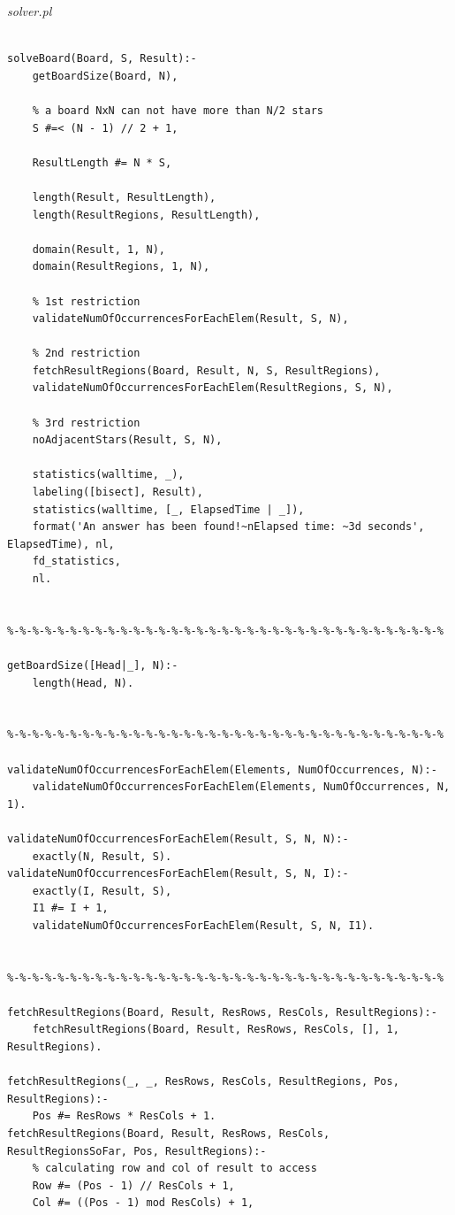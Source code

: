 \documentclass[runningheads,a4paper]{llncs}
\begin{document}
\noindent
{\it solver.pl}
\begin{changemargin}{-3cm}{-4cm}
\begin{verbatim}

solveBoard(Board, S, Result):-
    getBoardSize(Board, N),

    % a board NxN can not have more than N/2 stars
    S #=< (N - 1) // 2 + 1,

    ResultLength #= N * S,

    length(Result, ResultLength),
    length(ResultRegions, ResultLength),

    domain(Result, 1, N),
    domain(ResultRegions, 1, N),

    % 1st restriction
    validateNumOfOccurrencesForEachElem(Result, S, N),

    % 2nd restriction
    fetchResultRegions(Board, Result, N, S, ResultRegions),
    validateNumOfOccurrencesForEachElem(ResultRegions, S, N),

    % 3rd restriction
    noAdjacentStars(Result, S, N),

    statistics(walltime, _),
    labeling([bisect], Result),
    statistics(walltime, [_, ElapsedTime | _]),
    format('An answer has been found!~nElapsed time: ~3d seconds', ElapsedTime), nl,
    fd_statistics,
    nl.


%-%-%-%-%-%-%-%-%-%-%-%-%-%-%-%-%-%-%-%-%-%-%-%-%-%-%-%-%-%-%-%-%-%-%

getBoardSize([Head|_], N):-
    length(Head, N).


%-%-%-%-%-%-%-%-%-%-%-%-%-%-%-%-%-%-%-%-%-%-%-%-%-%-%-%-%-%-%-%-%-%-%

validateNumOfOccurrencesForEachElem(Elements, NumOfOccurrences, N):-
    validateNumOfOccurrencesForEachElem(Elements, NumOfOccurrences, N, 1).

validateNumOfOccurrencesForEachElem(Result, S, N, N):-
    exactly(N, Result, S).
validateNumOfOccurrencesForEachElem(Result, S, N, I):-
    exactly(I, Result, S),
    I1 #= I + 1,
    validateNumOfOccurrencesForEachElem(Result, S, N, I1).


%-%-%-%-%-%-%-%-%-%-%-%-%-%-%-%-%-%-%-%-%-%-%-%-%-%-%-%-%-%-%-%-%-%-%

fetchResultRegions(Board, Result, ResRows, ResCols, ResultRegions):-
    fetchResultRegions(Board, Result, ResRows, ResCols, [], 1, ResultRegions).

fetchResultRegions(_, _, ResRows, ResCols, ResultRegions, Pos, ResultRegions):-
    Pos #= ResRows * ResCols + 1.
fetchResultRegions(Board, Result, ResRows, ResCols, ResultRegionsSoFar, Pos, ResultRegions):-
    % calculating row and col of result to access
    Row #= (Pos - 1) // ResCols + 1,
    Col #= ((Pos - 1) mod ResCols) + 1,


\end{verbatim}
\end{changemargin}
\end{document}
